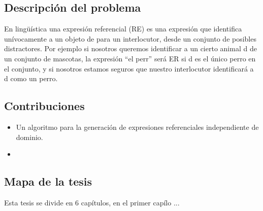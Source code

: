 
\subsection{Descripci\'on del problema}


En ling\"u\'{i}stica una expresi\'on referencial (RE) es una expresi\'on que identifica un\'{i}vocamente a un objeto de para un interlocutor, desde un conjunto de posibles distractores. Por ejemplo si nosotros queremos identificar a un cierto animal d de un conjunto de mascotas, la expresi\'on ``el perr'' ser\'a ER si d es el \'unico perro en el conjunto, y si nosotros estamos seguros que nuestro interlocutor identificar\'a a d como un perro.


\subsection{Contribuciones}

\begin{itemize}
 \item Un algoritmo para la generaci\'on de expresiones referenciales independiente de dominio.
 \item
\end{itemize}

\subsection{Mapa de la tesis}
Esta tesis se divide en 6 cap\'{i}tulos, en el primer cap\'{i}lo ...

